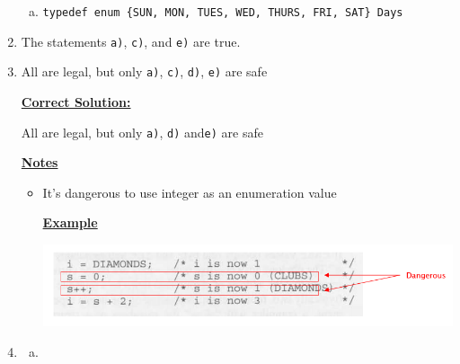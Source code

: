 \documentclass[12pt]{article}
\begin{document}
\begin{enumerate}[1.]
\begin{enumerate}[a)]
        \item

        \texttt{typedef enum \{SUN, MON, TUES, WED, THURS, FRI, SAT\} Days}


    \end{enumerate}

    \item

    The statements \texttt{a)}, \texttt{c)}, and \texttt{e)} are true.

    \item

    All are legal, but only \texttt{a)}, \texttt{c)}, \texttt{d)}, \texttt{e)} are safe

    \bigskip

    \begin{mdframed}

    \underline{\textbf{Correct Solution:}}

    \bigskip

    All are legal, but only \texttt{a)}, \texttt{d)} \color{red}and\color{black}\:\texttt{e)} are safe

    \end{mdframed}

    \bigskip

    \underline{\textbf{Notes}}

    \begin{itemize}
        \item It's dangerous to use integer as an enumeration value

        \bigskip

        \underline{\textbf{Example}}

        \begin{center}
        \includegraphics[width=\linewidth]{images/review_7_solution_14.png}
        \end{center}
    \end{itemize}

    \item

    \begin{enumerate}[a)]
        \item


\end{enumerate}
\end{enumerate}
\end{document}
